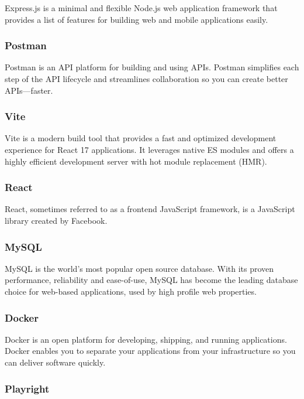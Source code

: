 Express.js is a minimal and flexible Node.js web application framework that provides a list of features for building web and mobile applications easily.

\subsubsection*{\protect{} Postman}

Postman is an API platform for building and using APIs. Postman simplifies each step of the API lifecycle and streamlines collaboration so you can create better APIs—faster.

\subsubsection*{\protect{} Vite}

Vite is a modern build tool that provides a fast and optimized development experience for React 17 applications. It leverages native ES modules and offers a highly efficient development server with hot module replacement (HMR).

\subsubsection*{\protect{} React}

React, sometimes referred to as a frontend JavaScript framework, is a JavaScript library created by Facebook.

\subsubsection*{\protect{} MySQL}

MySQL is the world's most popular open source database. With its proven performance, reliability and ease-of-use, MySQL has become the leading database choice for web-based applications, used by high profile web properties.

\subsubsection*{\protect{} Docker}

Docker is an open platform for developing, shipping, and running applications. Docker enables you to separate your applications from your infrastructure so you can deliver software quickly.

\subsubsection*{\protect{} Playright}

